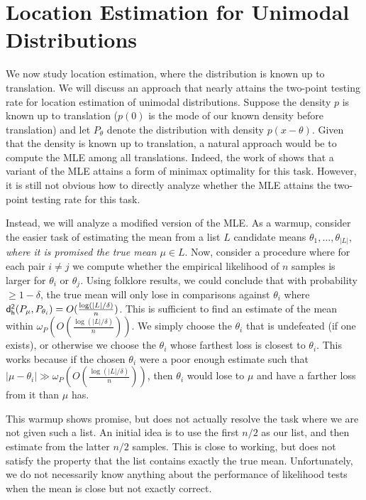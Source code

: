 \section{Location Estimation for Unimodal Distributions}
We now study location estimation, where the distribution is known up to translation. We will discuss an approach that nearly attains the two-point testing rate for location estimation of unimodal distributions. Suppose the density $p$ is known up to translation ($p(0)$ is the mode of our known density before translation) and let $P_\theta$ denote the distribution with density $p(x-\theta)$. Given that the density is known up to translation, a natural approach would be to compute the MLE among all translations. Indeed, the work of \cite{gupta2024minimax} shows that a variant of the MLE attains a form of minimax optimality for this task. However, it is still not obvious how to directly analyze whether the MLE attains the two-point testing rate for this task. 

Instead, we will analyze a modified version of the MLE. As a warmup, consider the easier task of estimating the mean from a list $L$ candidate means $\theta_1,\dots,\theta_{|L|}$, \textit{where it is promised the true mean $\mu \in L$}. Now, consider a procedure where for each pair $i \ne j$ we compute whether the empirical likelihood of $n$ samples is larger for $\theta_i$ or $\theta_j$. Using folklore results, we could conclude that with probability $\ge 1 - \delta$, the true mean will only lose in comparisons against $\theta_i$ where $\mathsf{d_{h}^2}(P_\mu, P_{\theta_i}) = O(\frac{\log(|L|/\delta)}{n})$. This is sufficient to find an estimate of the mean within $\omega_P(O(\frac{\log(|L|/\delta)}{n}))$. We simply choose the $\theta_i$ that is undefeated (if one exists), or otherwise we choose the $\theta_i$ whose farthest loss is closest to $\theta_i$. This works because if the chosen $\theta_i$ were a poor enough estimate such that $|\mu - \theta_i| \gg \omega_P(O(\frac{\log(|L|/\delta)}{n}))$, then $\theta_i$ would lose to $\mu$ and have a farther loss from it than $\mu$ has.

This warmup shows promise, but does not actually resolve the task where we are not given such a list. An initial idea is to use the first $n/2$ as our list, and then estimate from the latter $n/2$ samples. This is close to working, but does not satisfy the property that the list contains exactly the true mean. Unfortunately, we do not necessarily know anything about the performance of likelihood tests when the mean is close but not exactly correct.

